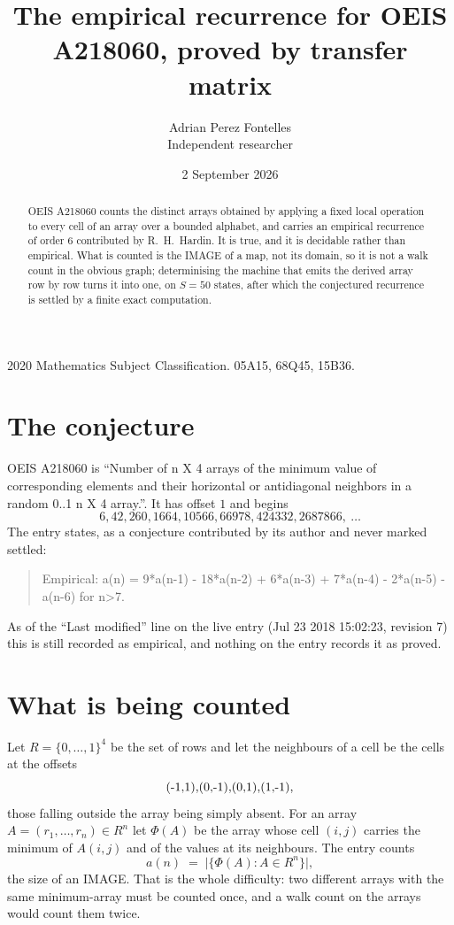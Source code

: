 \documentclass[11pt,a4paper]{article}
\title{The empirical recurrence for OEIS A218060, proved by transfer matrix}
\author{Adrian Perez Fontelles\\ \small Independent researcher}
\date{2 September 2026}
\theoremstyle{plain}
\theoremstyle{definition}
\begin{document}
\maketitle

\begin{abstract}
OEIS A218060 counts the distinct arrays obtained by applying a fixed local operation to every cell
of an array over a bounded alphabet, and carries an empirical recurrence of order $6$
contributed by R.~H.~Hardin. It is true, and it is decidable rather than empirical. What is
counted is the IMAGE of a map, not its domain, so it is not a walk count in the obvious graph;
determinising the machine that emits the derived array row by row turns it into one, on
$S=50$ states, after which the conjectured recurrence is settled by a finite exact
computation.
\end{abstract}

\noindent\small 2020 Mathematics Subject Classification. 05A15, 68Q45, 15B36.\normalsize

\section{The conjecture}

OEIS A218060 is ``Number of n X 4 arrays of the minimum value of corresponding elements and their horizontal or antidiagonal neighbors in a random 0..1 n X 4 array.''. It has offset $1$ and begins
\[
6, 42, 260, 1664, 10566, 66978, 424332, 2687866,\ \dots
\]
The entry states, as a conjecture contributed by its author and never marked settled:
\begin{quote}
Empirical: a(n) = 9*a(n-1) - 18*a(n-2) + 6*a(n-3) + 7*a(n-4) - 2*a(n-5) - a(n-6) for n>7.
\end{quote}
As of the ``Last modified'' line on the live entry (Jul 23 2018 15:02:23, revision 7) this is still
recorded as empirical, and nothing on the entry records it as proved.

\section{What is being counted}

Let $R=\{0,\dots,1\}^{4}$ be the set of rows and let the neighbours of
a cell be the cells at the offsets
\[
$(-1,1)$, $(0,-1)$, $(0,1)$, $(1,-1)$,
\]
those falling outside the array being simply absent. For an array
$A=(r_1,\dots,r_n)\in R^n$ let $\Phi(A)$ be the array whose cell $(i,j)$ carries the
minimum of $A(i,j)$ and of the values at its neighbours. The entry counts
\[
a(n)\;=\;\bigl|\{\Phi(A):A\in R^n\}\bigr| ,
\]
the size of an IMAGE. That is the whole difficulty: two different arrays with the same
minimum-array must be counted once, and a walk count on the arrays would count them twice.
\end{document}
